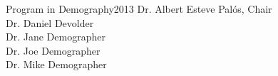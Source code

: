 






{Program in Demography}{2013}
{Dr. Albert Esteve Pal\'{o}s, Chair\\
 Dr. Daniel Devolder\\
 Dr. Jane Demographer\\
 Dr. Joe Demographer\\
 Dr. Mike Demographer}

\initializefrontsections



\makeatletter
\if@twoside \setcounter{page}{4} \else \setcounter{page}{1} \fi
\makeatother
 

\startacknowledgementspage
{}
\label{Acknowledgements}

%

\tableofcontents     %
\listoffigures       %

